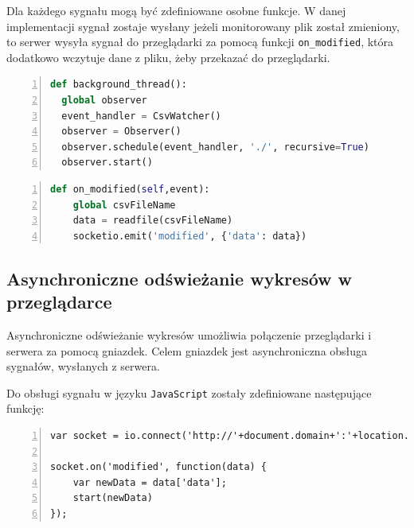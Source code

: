 \documentclass[a4paper]{article}
\begin{document}
    Dla każdego sygnału mogą być zdefiniowane osobne funkcje. 
    W danej implementacji sygnał zostaje wysłany 
    jeżeli monitorowany plik został zmieniony, to serwer wysyła sygnał
    do przeglądarki za pomocą funkcji \texttt{on\_modified}, która dodatkowo
    wczytuje dane z pliku, żeby przekazać do przeglądarki.
   \begin{lstlisting}[frame=single, numbers=left, basicstyle=\ttfamily\small, language=python,
    caption={Definicja wątku, monitorującego zmiany w plikach o zadanych rozszerzeniu}]
def background_thread():
  global observer
  event_handler = CsvWatcher()
  observer = Observer()
  observer.schedule(event_handler, './', recursive=True)
  observer.start()
   \end{lstlisting}

\begin{lstlisting}[frame=single, numbers=left, basicstyle=\ttfamily\small, language=python,
    caption={Definicja funkcji wysyłającej sygnał i dane}]
def on_modified(self,event):
    global csvFileName
    data = readfile(csvFileName)
    socketio.emit('modified', {'data': data})
   \end{lstlisting}

    \subsection{Asynchroniczne odświeżanie wykresów w przeglądarce}
    Asynchroniczne odświeżanie wykresów umożliwia połączenie przeglądarki i serwera za pomocą gniazdek.
    Celem gniazdek jest asynchroniczna obsługa sygnałów, wysłanych z serwera.
    
    Do obsługi sygnału w języku \texttt{JavaScript} zostały zdefiniowane następujące funkcję:
\begin{lstlisting}[frame=single, numbers=left, basicstyle=\ttfamily\small,
    caption={Połączenie gniazdek w przeglądrce z serwerem i odebranie danych}]
var socket = io.connect('http://'+document.domain+':'+location.port);

socket.on('modified', function(data) {
    var newData = data['data'];
    start(newData)
});

\end{lstlisting}


\end{document}
